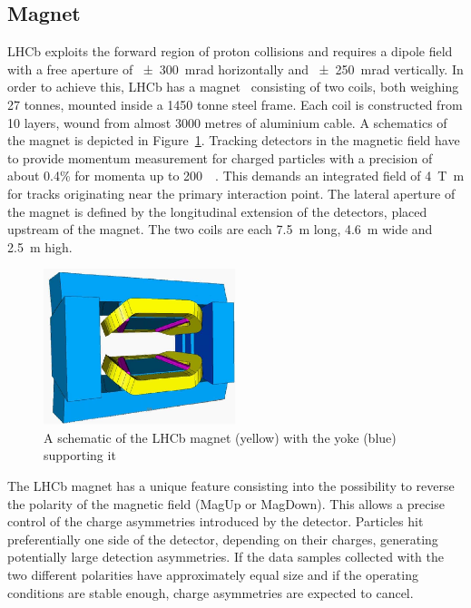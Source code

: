 \subsection{Magnet}
LHCb exploits the forward region of proton collisions and requires a dipole field with a free aperture of \SI{\pm300}{\milli\radian} horizontally and \SI{\pm250}{\milli\radian} vertically. In order to achieve this, LHCb has a magnet~\cite{LHCb:2000xej} consisting of two coils, both weighing 27 tonnes, mounted inside a 1450 tonne steel frame. Each coil is constructed from 10 layers, wound from almost 3000 metres of aluminium cable. A schematics of the magnet is depicted in Figure~\ref{fig:magnet}.
Tracking detectors in the magnetic field have to provide momentum measurement for charged particles with a precision of about 0.4\% for momenta up to \SI[per-mode=symbol]{200}{\giga\eVperc}. This demands an integrated field of \SI{4}{\tesla\meter} for tracks originating near the primary interaction point.
 The lateral aperture of the magnet is defined by the longitudinal extension of the detectors, placed upstream of the magnet. The two coils are each \SI{7.5}{\meter} long, \SI{4.6}{\meter} wide and \SI{2.5}{\meter} high.
\begin{figure}
    \centering
    \includegraphics[width=0.5\textwidth]{figures/lhcb-magnet.png}
    \caption{A schematic of the LHCb magnet (yellow) with the yoke (blue) supporting it}
    \label{fig:magnet}
\end{figure}
The LHCb magnet has a unique feature consisting into the possibility to reverse the polarity of the magnetic field (MagUp or MagDown). This allows a precise control of the charge asymmetries introduced by the detector. Particles hit preferentially one side of the detector, depending on their charges, generating potentially large detection asymmetries. If the data samples collected with the two different polarities have approximately equal size and if the operating conditions are stable enough, charge asymmetries are expected to cancel.

